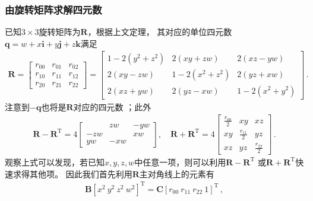 \subsubsection{由旋转矩阵求解四元数}
已知$3\times3$旋转矩阵为$\bm R$，根据上文定理，
其对应的单位四元数$\bm q=w+x\mathbf{i}+y\mathbf{j}+z\mathbf{k}$满足
\begin{align}
    \bm R=\left[\begin{array}{ccc}
            r_{00} & r_{01} & r_{02} \\
            r_{10} & r_{11} & r_{12} \\
            r_{20} & r_{21} & r_{22}
        \end{array}\right]
    =\left[\begin{array}{ccc}
            1-2(y^2+z^2) & 2(xy+zw)     & 2(xz-yw)     \\
            2(xy-zw)     & 1-2(x^2+z^2) & 2(yz+xw)     \\
            2(xz+yw)     & 2(yz-xw)     & 1-2(x^2+y^2)
        \end{array}\right]\, .
\end{align}
注意到$-\bm q$也将是$\bm R$对应的四元数
；此外
\begin{align}\label{eq:02ex.1}
    \bm R-\bm R^\mathrm{T}=4\left[\begin{array}{ccc}
                & zw  & -yw \\
            -zw &     & xw  \\
            yw  & -xw &
        \end{array}\right],\quad
    \bm R+\bm R^\mathrm{T}=4\left[\begin{array}{ccc}
            \displaystyle\frac{r_{00}}{2} & xy                            & xz                            \\
            xy                            & \displaystyle\frac{r_{11}}{2} & yz                            \\
            xz                            & yz                            & \displaystyle\frac{r_{22}}{2}
        \end{array}\right]\, .
\end{align}
观察上式可以发现，若已知$x,y,z,w$中任意一项，则可以利用$\bm R-\bm R^\mathrm{T}$
或$\bm R+\bm R^\mathrm{T}$快速求得其他项。
因此我们首先利用$\bm R$主对角线上的元素有
\begin{align}
    \bm B[x^2\ y^2\ z^2\ w^2]^\mathrm{T}=\bm C[r_{00}\ r_{11}\ r_{22}\ 1]^\mathrm{T}\, ,
\end{align}
